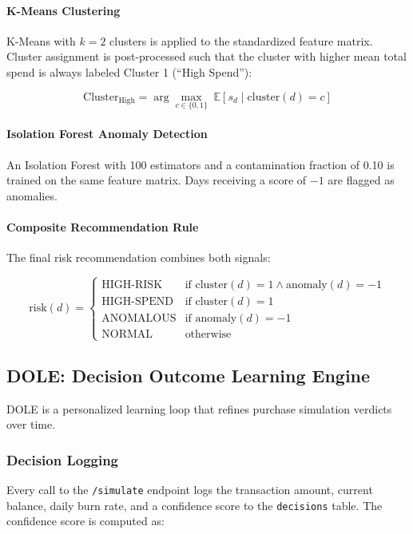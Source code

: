 \documentclass[]{IEEEtran}
\begin{document}
\paragraph{K-Means Clustering}
K-Means with $k=2$ clusters is applied to the standardized feature matrix. Cluster assignment is post-processed such that the cluster with higher mean total spend is always labeled Cluster 1 (``High Spend''):

\begin{equation}
\text{Cluster}_{\text{High}} = \arg\max_{c \in \{0,1\}} \; \mathbb{E}[s_d \mid \text{cluster}(d) = c]
\end{equation}

\paragraph{Isolation Forest Anomaly Detection}
An Isolation Forest with 100 estimators and a contamination fraction of 0.10 is trained on the same feature matrix. Days receiving a score of $-1$ are flagged as anomalies.

\paragraph{Composite Recommendation Rule}
The final risk recommendation combines both signals:

\begin{equation}
\text{risk}(d) =
\begin{cases}
\text{HIGH-RISK} & \text{if cluster}(d)=1 \wedge \text{anomaly}(d)=-1 \\
\text{HIGH-SPEND} & \text{if cluster}(d)=1 \\
\text{ANOMALOUS} & \text{if anomaly}(d)=-1 \\
\text{NORMAL} & \text{otherwise}
\end{cases}
\end{equation}

\subsection{DOLE: Decision Outcome Learning Engine}

DOLE is a personalized learning loop that refines purchase simulation verdicts over time.

\subsubsection{Decision Logging}
Every call to the \texttt{/simulate} endpoint logs the transaction amount, current balance, daily burn rate, and a confidence score to the \texttt{decisions} table. The confidence score is computed as:
\end{document}
